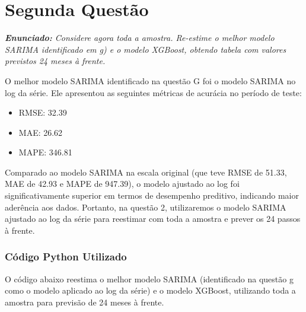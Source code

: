 \documentclass[a4paper, 12pt]{article}
\begin{document}
\newpage
\section{Segunda Questão}
\textit{\textbf{Enunciado:} Considere agora toda a amostra. Re-estime o melhor modelo SARIMA identificado em g) e o
modelo XGBoost, obtendo tabela com valores previstos 24 meses à frente.
}


O melhor modelo SARIMA identificado na questão G foi o modelo SARIMA no log da série. Ele apresentou as seguintes métricas de acurácia no período de teste:

\begin{itemize}
    \item RMSE: 32.39
    \item MAE: 26.62
    \item MAPE: 346.81
\end{itemize}

Comparado ao modelo SARIMA na escala original (que teve RMSE de 51.33, MAE de 42.93 e MAPE de 947.39), o modelo ajustado ao log foi significativamente superior em termos de desempenho preditivo, indicando maior aderência aos dados. Portanto, na questão 2, utilizaremos o modelo SARIMA ajustado ao log da série para reestimar com toda a amostra e prever os 24 passos à frente.\\


\subsubsection{Código Python Utilizado}
O código abaixo reestima o melhor modelo SARIMA (identificado na questão g como o modelo aplicado ao log da série) e o modelo XGBoost, utilizando toda a amostra para previsão de 24 meses à frente.
\end{document}
